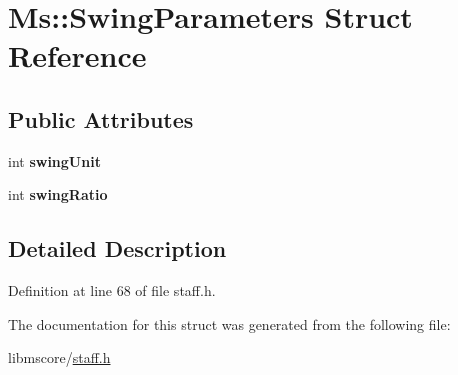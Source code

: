 \hypertarget{struct_ms_1_1_swing_parameters}{}\section{Ms\+:\+:Swing\+Parameters Struct Reference}
\label{struct_ms_1_1_swing_parameters}
\subsection*{Public Attributes}
\begin{DoxyCompactItemize}
\item 
\mbox{\label{struct_ms_1_1_swing_parameters_a1934db3c9ff03cc8a528d077dc6ae9e0}} 
int {\bfseries swing\+Unit}
\item 
\mbox{\label{struct_ms_1_1_swing_parameters_ac13e85b1114d77c3662c7fc633747e7f}} 
int {\bfseries swing\+Ratio}
\end{DoxyCompactItemize}


\subsection{Detailed Description}


Definition at line 68 of file staff.\+h.



The documentation for this struct was generated from the following file\+:\begin{DoxyCompactItemize}
\item 
libmscore/\hyperlink{staff_8h}{staff.\+h}\end{DoxyCompactItemize}
